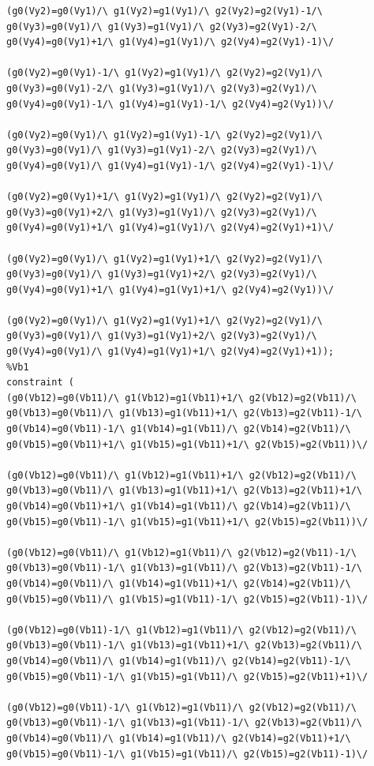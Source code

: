 \begin{appendices}
\begin{lstlisting}
(g0(Vy2)=g0(Vy1)/\ g1(Vy2)=g1(Vy1)/\ g2(Vy2)=g2(Vy1)-1/\ g0(Vy3)=g0(Vy1)/\ g1(Vy3)=g1(Vy1)/\ g2(Vy3)=g2(Vy1)-2/\ g0(Vy4)=g0(Vy1)+1/\ g1(Vy4)=g1(Vy1)/\ g2(Vy4)=g2(Vy1)-1)\/ 

(g0(Vy2)=g0(Vy1)-1/\ g1(Vy2)=g1(Vy1)/\ g2(Vy2)=g2(Vy1)/\ g0(Vy3)=g0(Vy1)-2/\ g1(Vy3)=g1(Vy1)/\ g2(Vy3)=g2(Vy1)/\ g0(Vy4)=g0(Vy1)-1/\ g1(Vy4)=g1(Vy1)-1/\ g2(Vy4)=g2(Vy1))\/ 

(g0(Vy2)=g0(Vy1)/\ g1(Vy2)=g1(Vy1)-1/\ g2(Vy2)=g2(Vy1)/\ g0(Vy3)=g0(Vy1)/\ g1(Vy3)=g1(Vy1)-2/\ g2(Vy3)=g2(Vy1)/\ g0(Vy4)=g0(Vy1)/\ g1(Vy4)=g1(Vy1)-1/\ g2(Vy4)=g2(Vy1)-1)\/ 

(g0(Vy2)=g0(Vy1)+1/\ g1(Vy2)=g1(Vy1)/\ g2(Vy2)=g2(Vy1)/\ g0(Vy3)=g0(Vy1)+2/\ g1(Vy3)=g1(Vy1)/\ g2(Vy3)=g2(Vy1)/\ g0(Vy4)=g0(Vy1)+1/\ g1(Vy4)=g1(Vy1)/\ g2(Vy4)=g2(Vy1)+1)\/ 

(g0(Vy2)=g0(Vy1)/\ g1(Vy2)=g1(Vy1)+1/\ g2(Vy2)=g2(Vy1)/\ g0(Vy3)=g0(Vy1)/\ g1(Vy3)=g1(Vy1)+2/\ g2(Vy3)=g2(Vy1)/\ g0(Vy4)=g0(Vy1)+1/\ g1(Vy4)=g1(Vy1)+1/\ g2(Vy4)=g2(Vy1))\/ 

(g0(Vy2)=g0(Vy1)/\ g1(Vy2)=g1(Vy1)+1/\ g2(Vy2)=g2(Vy1)/\ g0(Vy3)=g0(Vy1)/\ g1(Vy3)=g1(Vy1)+2/\ g2(Vy3)=g2(Vy1)/\ g0(Vy4)=g0(Vy1)/\ g1(Vy4)=g1(Vy1)+1/\ g2(Vy4)=g2(Vy1)+1));
%Vb1
constraint ( 
(g0(Vb12)=g0(Vb11)/\ g1(Vb12)=g1(Vb11)+1/\ g2(Vb12)=g2(Vb11)/\ g0(Vb13)=g0(Vb11)/\ g1(Vb13)=g1(Vb11)+1/\ g2(Vb13)=g2(Vb11)-1/\ g0(Vb14)=g0(Vb11)-1/\ g1(Vb14)=g1(Vb11)/\ g2(Vb14)=g2(Vb11)/\ g0(Vb15)=g0(Vb11)+1/\ g1(Vb15)=g1(Vb11)+1/\ g2(Vb15)=g2(Vb11))\/ 

(g0(Vb12)=g0(Vb11)/\ g1(Vb12)=g1(Vb11)+1/\ g2(Vb12)=g2(Vb11)/\ g0(Vb13)=g0(Vb11)/\ g1(Vb13)=g1(Vb11)+1/\ g2(Vb13)=g2(Vb11)+1/\ g0(Vb14)=g0(Vb11)+1/\ g1(Vb14)=g1(Vb11)/\ g2(Vb14)=g2(Vb11)/\ g0(Vb15)=g0(Vb11)-1/\ g1(Vb15)=g1(Vb11)+1/\ g2(Vb15)=g2(Vb11))\/ 

(g0(Vb12)=g0(Vb11)/\ g1(Vb12)=g1(Vb11)/\ g2(Vb12)=g2(Vb11)-1/\ g0(Vb13)=g0(Vb11)-1/\ g1(Vb13)=g1(Vb11)/\ g2(Vb13)=g2(Vb11)-1/\ g0(Vb14)=g0(Vb11)/\ g1(Vb14)=g1(Vb11)+1/\ g2(Vb14)=g2(Vb11)/\ g0(Vb15)=g0(Vb11)/\ g1(Vb15)=g1(Vb11)-1/\ g2(Vb15)=g2(Vb11)-1)\/ 

(g0(Vb12)=g0(Vb11)-1/\ g1(Vb12)=g1(Vb11)/\ g2(Vb12)=g2(Vb11)/\ g0(Vb13)=g0(Vb11)-1/\ g1(Vb13)=g1(Vb11)+1/\ g2(Vb13)=g2(Vb11)/\ g0(Vb14)=g0(Vb11)/\ g1(Vb14)=g1(Vb11)/\ g2(Vb14)=g2(Vb11)-1/\ g0(Vb15)=g0(Vb11)-1/\ g1(Vb15)=g1(Vb11)/\ g2(Vb15)=g2(Vb11)+1)\/ 

(g0(Vb12)=g0(Vb11)-1/\ g1(Vb12)=g1(Vb11)/\ g2(Vb12)=g2(Vb11)/\ g0(Vb13)=g0(Vb11)-1/\ g1(Vb13)=g1(Vb11)-1/\ g2(Vb13)=g2(Vb11)/\ g0(Vb14)=g0(Vb11)/\ g1(Vb14)=g1(Vb11)/\ g2(Vb14)=g2(Vb11)+1/\ g0(Vb15)=g0(Vb11)-1/\ g1(Vb15)=g1(Vb11)/\ g2(Vb15)=g2(Vb11)-1)\/ 


\end{lstlisting}
\end{appendices}
